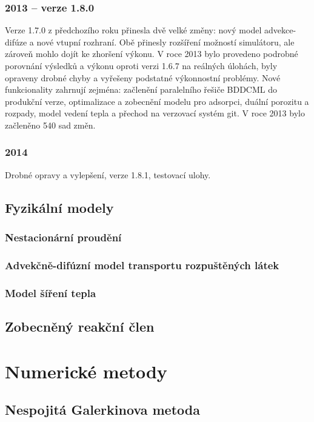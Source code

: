 \documentclass[11pt]{report}
\begin{document}
\subsubsection{2013 -- verze 1.8.0}
Verze 1.7.0 z předchozího roku přinesla dvě velké změny: nový model 
advekce-difúze a nové vtupní rozhraní. Obě přinesly rozšíření možností 
simulátoru, ale zároveň mohlo dojít ke zhoršení výkonu. V roce 2013 bylo 
provedeno podrobné porovnání výsledků a výkonu oproti verzi 1.6.7 na reálných 
úlohách, byly opraveny drobné chyby a vyřešeny podstatné výkonnostní problémy.  
Nové funkcionality zahrnují zejména: začlenění paralelního řešiče BDDCML do 
produkční verze, optimalizace a zobecnění modelu pro adsorpci, duální porozitu a 
rozpady, model vedení tepla a přechod na verzovací systém git. V roce 2013 bylo 
začleněno 540 sad změn.
\subsubsection{2014}
Drobné opravy a vylepšení, verze 1.8.1, testovací ulohy.

\subsection{Fyzikální modely}
\subsubsection{Nestacionární proudění}


\subsubsection{Advekčně-difúzní model transportu rozpuštěných látek}
\label{sc:transport_model}


\subsubsection{Model šíření tepla}
\label{sc:heat}


\subsection{Zobecněný reakční člen}

\section{Numerické metody}
\subsection{Nespojitá Galerkinova metoda}

\end{document}
